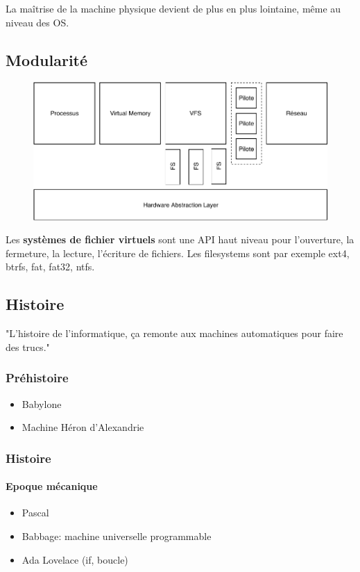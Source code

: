 \documentclass[11pt]{article}
\begin{document}
La maîtrise de la machine physique devient de plus en plus lointaine, même au niveau des OS.

\subsection{Modularité}
\begin{figure}[ht]
    \centering
    \includegraphics{img/modular-os.pdf}
\end{figure}

Les \textbf{systèmes de fichier virtuels} sont une API haut niveau pour l'ouverture, la fermeture, la lecture, l'écriture de fichiers. Les filesystems sont par exemple ext4, btrfs, fat, fat32, ntfs.

\subsection{Histoire}
"L'histoire de l'informatique, ça remonte aux machines automatiques pour faire des trucs."
\subsubsection{Préhistoire}
\begin{itemize}
    \item Babylone
    \item Machine Héron d'Alexandrie
\end{itemize}

\subsubsection{Histoire}
\paragraph{Epoque mécanique}
\begin{itemize}
    \item Pascal
    \item Babbage: machine universelle programmable
    \item Ada Lovelace (if, boucle)
\end{itemize}
\end{document}
